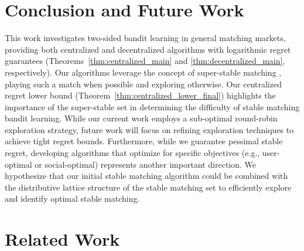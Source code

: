 \documentclass{article}
\begin{document}
\section{Conclusion and Future Work}
This work investigates two-sided bandit learning in general matching markets, providing both centralized and decentralized algorithms with logarithmic regret guarantees (Theorems~\ref{thm:centralized_main} and \ref{thm:decentralized_main}, respectively). Our algorithms leverage the concept of super-stable matching \cite{irving1994stable}, playing such a match when possible and exploring otherwise.  Our centralized regret lower bound (Theorem~\ref{thm:centralized_lower_final}) highlights the importance of the super-stable set in determining the difficulty of stable matching bandit learning.  While our current work employs a sub-optimal round-robin exploration strategy, future work will focus on refining exploration techniques to achieve tight regret bounds.  Furthermore, while we guarantee pessimal stable regret, developing algorithms that optimize for specific objectives (e.g., user-optimal or social-optimal) represents another important direction. We hypothesize that our initial stable matching algorithm could be combined with the distributive lattice structure of the stable matching set to efficiently explore and identify optimal stable matching.




  
  
\newpage
\appendix
\section{Related Work}
\end{document}
